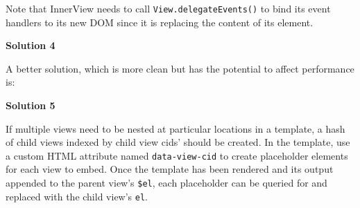 \documentclass[9pt]{book}
\newenvironment{Shaded}{}{}
\newcommand{\KeywordTok}[1]{\textcolor[rgb]{0.00,0.44,0.13}{\textbf{{#1}}}}
\newcommand{\DataTypeTok}[1]{\textcolor[rgb]{0.56,0.13,0.00}{{#1}}}
\newcommand{\CommentTok}[1]{\textcolor[rgb]{0.38,0.63,0.69}{\textit{{#1}}}}
\newcommand{\OtherTok}[1]{\textcolor[rgb]{0.00,0.44,0.13}{{#1}}}
\newcommand{\FunctionTok}[1]{\textcolor[rgb]{0.02,0.16,0.49}{{#1}}}
\newcommand{\NormalTok}[1]{{#1}}
\begin{document}
Note that InnerView needs to call \texttt{View.delegateEvents()} to bind
its event handlers to its new DOM since it is replacing the content of
its element.

\textbf{Solution 4}

A better solution, which is more clean but has the potential to affect
performance is:

\begin{Shaded}
\end{Shaded}

\textbf{Solution 5}

If multiple views need to be nested at particular locations in a
template, a hash of child views indexed by child view cids' should be
created. In the template, use a custom HTML attribute named
\texttt{data-view-cid} to create placeholder elements for each view to
embed. Once the template has been rendered and its output appended to
the parent view's \texttt{\$el}, each placeholder can be queried for and
replaced with the child view's \texttt{el}.
\end{document}
